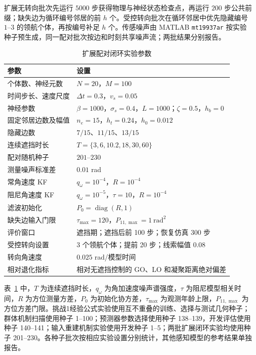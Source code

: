\documentclass[UTF8,fontset=windows,11pt]{ctexart}
\begin{document}
扩展无转向批次先运行 $5000$ 步获得物理与神经状态检查点，再运行 $200$ 步公共前缀；缺失边为循环编号邻居的前 $h$ 个。受控转向批次在循环邻居中优先隐藏编号 $1$--$3$ 的领航个体，再按编号补足 $h$ 个。传感噪声由 MATLAB \texttt{mt19937ar} 按实验种子预生成，同一配对批次按边和时刻共享噪声流；两批结果分别报告。

\begin{table}[!tbp]
 \centering
 \small
 \caption{扩展配对闭环实验参数}
 \label{tab:simulation_setup}
 \begin{tabular}{ll}
 \toprule
 参数 & 设置\\
 \midrule
 个体数、神经元数 & $N=20$，$M=100$\\
 时间步长、速度尺度 & $\Delta t=0.3$，$v_s=0.05$\\
 神经参数 & $\beta=1000$，$\sigma_s=0.4$，$L=1000$；$\zeta=0.5$，$h_b=0$\\
 固定邻居边数及幅值 & $n_e=15$，$h_t=0.24$，$h_0=0.012$\\
 隐藏边数 & $7/15$、$11/15$、$13/15$\\
 连续遮挡时长 & $T=\{3,6,10.2,18,30,60\}$\\
 配对随机种子 & $201$--$230$\\
 测量噪声标准差 & $0.01$ rad\\
 常角速度 KF & $q_\omega=10^{-4}$，$R=10^{-4}$\\
 阻尼角速度 KF & $q_\omega=10^{-5}$，$\tau=10$，$R=10^{-4}$\\
 滤波初始化 & $P_0=\operatorname{diag}(R,1)$\\
缺失边输入门限 & $\tau_{\max}=120$，$P_{11,\max}=1\ \mathrm{rad}^2$\\
评价窗口 & 遮挡期；遮挡后前 100 步；恢复仿真 300 步\\
受控转向设置 & 3 个领航个体；提前 20 步；线索幅值 $0.08$\\
转向角速度 & $0.025$ rad/模型时间\\
相对退化指标 & 相对无遮挡控制的 GO、LO 和凝聚距离绝对偏差\\
 \bottomrule
 \end{tabular}
\end{table}

表~\ref{tab:simulation_setup} 中，$T$ 为连续遮挡时长，$q_\omega$ 为角加速度噪声谱强度，$\tau$ 为阻尼模型相关时间，$R$ 为方位测量方差，$P_0$ 为初始化协方差，$\tau_{\max}$ 为观测年龄上限，$P_{11,\max}$ 为方位方差门限。挑战1经验公式实验使用互不重叠的训练、选择与测试几何种子；群体机制扫描使用种子 1--100；预测器参数选择使用种子 138--139，开发评估使用种子 140--141；输入重建机制实验使用开发种子 1--5；两批扩展闭环实验均使用种子 201--230。各种子批次按相应实验设置分别统计，其他感知模型的参考结果单独报告。
\end{document}

